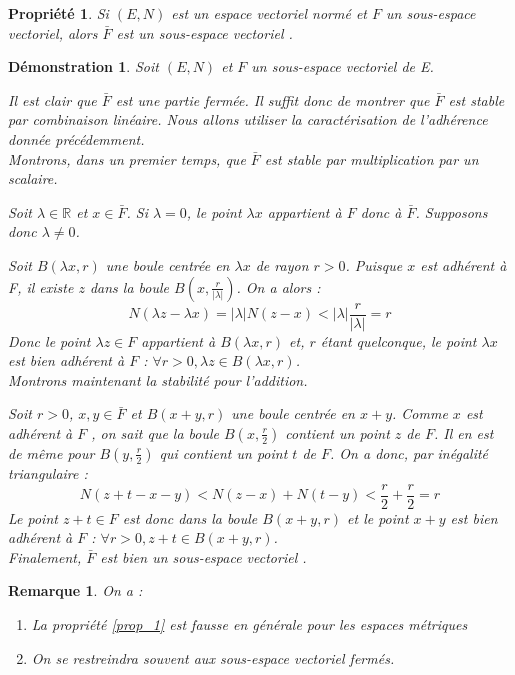 \documentclass[a4paper, oneside]{report}
\theoremstyle{break}
\newtheorem{propr}[thm]{Propriété}
\newtheorem*{demo}{Démonstration}
\newtheorem{remar}[thm]{Remarque}
\newcommand{\R}{\mathbb{R}}
\newcommand{\sev}{sous-espace vectoriel }
\newcommand{\ev}{espace vectoriel }
\begin{document}
\begin{propr}
\label{prop_2}
Si $(E,N)$ est un \ev normé et $F$ un sous-espace vectoriel, alors $\bar{F}$ est un \sev.
\end{propr}



\begin{demo}
Soit $(E,N)$ et $F$ un \sev de E.

Il est clair que $\bar{F}$ est une partie fermée. Il suffit donc de montrer que $\bar{F}$ est stable par combinaison linéaire. Nous allons utiliser la caractérisation de l'adhérence donnée précédemment. \\

Montrons, dans un premier temps, que $\bar{F}$ est stable par multiplication par un scalaire.

Soit $\lambda \in \R$ et $x \in \bar{F}$. Si $\lambda = 0$, le point $\lambda x$ appartient à $F$ donc à $\bar{F}$. Supposons donc $\lambda \neq 0$.

Soit $B(\lambda x, r)$ une boule centrée en $\lambda x$ de rayon $r > 0$. Puisque $x$ est adhérent à F, il existe $z$ dans la boule $B(x,\frac{r}{|\lambda|})$. On a alors :
$$N(\lambda z - \lambda x) = |\lambda|N(z-x) < |\lambda|\frac{r}{|\lambda|} = r$$
Donc le point $\lambda z\in F$ appartient à $B(\lambda x, r)$ et, $r$ étant quelconque, le point $\lambda x$ est bien adhérent à $F$ : $\forall r>0, \lambda z\in B(\lambda x, r)$.\\

Montrons maintenant la stabilité pour l'addition.

Soit $r>0$, $x,y\in \bar{F}$ et $B(x+y,r)$ une boule centrée en $x + y$. Comme $x$ est adhérent à $F$ , on sait que
la boule $B(x, \frac{r}{2})$ contient un point $z$ de $F$. Il en est de même pour $B(y, \frac{r}{2})$ qui contient un point $t$ de $F$. On a donc, par inégalité triangulaire : $$N(z+t-x-y)< N(z-x)+N(t-y)<\frac{r}{2} + \frac{r}{2} = r$$
Le point $z + t\in F$ est donc dans la boule $B(x + y, r)$ et le point $x + y$ est bien adhérent à $F$ : $\forall r>0, z+t\in B(x+y, r)$.\\

Finalement, $\bar{F}$ est bien un \sev.
\end{demo}



\begin{remar}
On a :
\begin{enumerate}
\item La propriété \ref{prop_1} est fausse en générale pour les espaces métriques
\item On se restreindra souvent aux \sev fermés.
\end{enumerate}
\end{remar}
\end{document}
